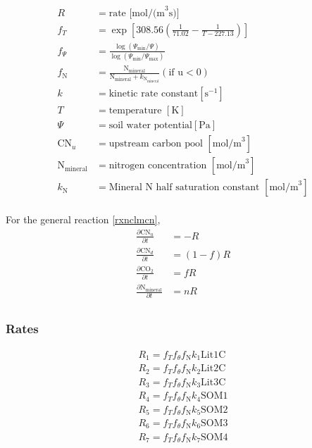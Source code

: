 \documentclass[12pt, a4paper]{article}
\begin{document}
\begin{align*}
R &= \text{rate [mol/(m}^3\text{s)]} \\
f_T & = \exp\left[308.56 \left(\frac{1}{71.02}-\frac{1}{T - 227.13}\right)\right]\\
f_\Psi & = \frac{\log\left(\Psi_\text{min}/\Psi\right)}{\log\left(\Psi_\text{min}/\Psi_\text{max}\right)}\\
f_\text{N} & = \frac{\text{N}_\text{mineral}}{\text{N}_\text{mineral} + k_{\text{N}_\text{mineral}}} (\text{if u} < 0) \\
k & = \text{kinetic rate constant} [\text{s}^{-1}]\\
T & = \text{temperature } [\text{K}] \\
\Psi & = \text{soil water potential} [\text{Pa}] \\
\text{CN}_u & = \text{upstream carbon pool } [\text{mol/m}^3] \\
\text{N}_\text{mineral} & = \text{nitrogen concentration } [\text{mol/m}^3] \\
k_\text{N} & = \text{Mineral N half saturation constant } [\text{mol/m}^3]\\
\end{align*}

For the general reaction \ref{rxnclmcn}, 
\begin{align*}
\frac{\partial \text{CN}_u}{\partial t} & = -R \\
\frac{\partial \text{CN}_d}{\partial t} & = \left(1-f\right) R \\
\frac{\partial \text{CO}_2}{\partial t} & = f R \\
\frac{\partial \text{N}_\text{mineral}}{\partial t} & = nR \\
\end{align*}

\subsubsection{Rates}
\begin{align*}
R_1 = f_T f_\theta f_\text{N} k_1 \text{Lit1C} \\
R_2 = f_T f_\theta f_\text{N} k_2 \text{Lit2C} \\
R_3 = f_T f_\theta f_\text{N} k_3 \text{Lit3C} \\
R_4 = f_T f_\theta f_\text{N} k_4 \text{SOM1} \\
R_5 = f_T f_\theta f_\text{N} k_5 \text{SOM2} \\
R_6 = f_T f_\theta f_\text{N} k_6 \text{SOM3} \\
R_7 = f_T f_\theta f_\text{N} k_7 \text{SOM4}
\end{align*}
\end{document}
